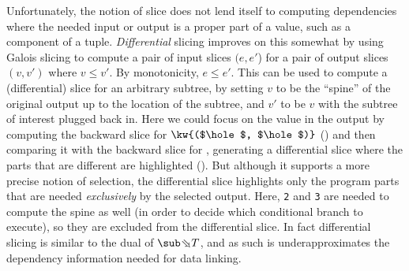 Unfortunately, the notion of slice does not lend itself to computing dependencies where the needed input or output is a proper part of a value, such as a component of a tuple. \emph{Differential} slicing \cite{perera12a} improves on this somewhat by using Galois slicing to compute a pair of input slices $(e,e'$) for a pair of output slices $(v,v')$ where $v \leq v'$. By monotonicity, $e \leq e'$. This can be used to compute a (differential) slice for an arbitrary subtree, by setting $v$ to be the ``spine'' of the original output up to the location of the subtree, and $v'$ to be $v$ with the subtree of interest plugged back in. Here we could focus on the value  in the output by computing the backward slice for $\kw{($\hole$, $\hole$)}$ () and then comparing it with the backward slice for , generating a differential slice where the parts that are different are highlighted (). But although it supports a more precise notion of selection, the differential slice highlights only the program parts that are needed \emph{exclusively} by the selected output. Here, \lstinline{2} and \lstinline{3} are needed to compute the spine as well (in order to decide which conditional branch to execute), so they are excluded from the differential slice. In fact differential slicing is similar to the dual of $\evalBwdF{T}$, and as such is underapproximates the dependency information needed for data linking.

